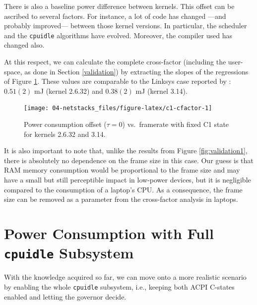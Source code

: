 \documentclass[twoside,nohyper]{tufte-book}
\theoremstyle{definition}
\theoremstyle{definition}
\theoremstyle{definition}
\theoremstyle{remark}
\begin{document}
There is also a baseline power difference between kernels. This offset
can be ascribed to several factors. For instance, a lot of code has
changed ---and probably improved--- between those kernel versions. In
particular, the scheduler and the \texttt{cpuidle} algorithms have
evolved. Moreover, the compiler used has changed also.

At this respect, we can calculate the complete cross-factor (including
the user-space, as done in Section \ref{validation}) by extracting the
slopes of the regressions of Figure \ref{fig:c1-cfactor}. These values
are comparable to the Linksys case reported by \citet{Serrano2014}:
\(0.51(2)\) mJ (kernel 2.6.32) and \(0.38(2)\) mJ (kernel 3.14).




\begin{figure}

{\centering \texttt{[image: 04-netstacks\_files/figure-latex/c1-cfactor-1]} 

}

\caption[Power consumption offset (\(\tau=0\)) vs.~framerate
with fixed C1 state for kernels 2.6.32 and 3.14.]{Power consumption offset (\(\tau=0\)) vs.~framerate
with fixed C1 state for kernels 2.6.32 and 3.14.}\label{fig:c1-cfactor}
\end{figure}

It is also important to note that, unlike the results from Figure
\ref{fig:validation1}, there is absolutely no dependence on the frame
size in this case. Our guess is that RAM memory consumption would be
proportional to the frame size and may have a small but still
perceptible impact in low-power devices, but it is negligible compared
to the consumption of a laptop's CPU. As a consequence, the frame size
can be removed as a parameter from the cross-factor analysis in laptops.

\hypertarget{power-consumption-with-full-cpuidle-subsystem}{%
\section{\texorpdfstring{Power Consumption with Full \texttt{cpuidle}
Subsystem}{Power Consumption with Full cpuidle Subsystem}}\label{power-consumption-with-full-cpuidle-subsystem}}

With the knowledge acquired so far, we can move onto a more realistic
scenario by enabling the whole \texttt{cpuidle} subsystem, i.e., keeping
both ACPI C-states enabled and letting the governor decide.
\end{document}
